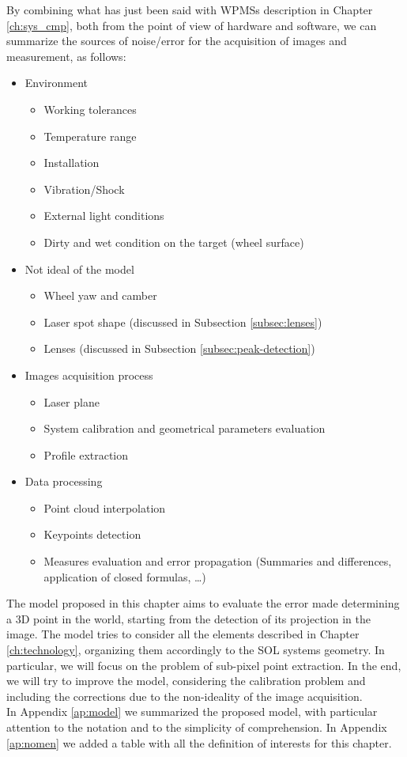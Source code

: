By combining what has just been said with \acs{WPMS}s description in Chapter \ref{ch:sys_cmp}, both from the point of view of hardware and software, we can summarize the sources of noise/error for the acquisition of images and measurement, as follows:
  \begin{itemize}
    \item Environment
      \begin{itemize}
        \item Working tolerances
        \item Temperature range
        \item Installation
        \item Vibration/Shock
        \item External light conditions
        \item Dirty and wet condition on the target (wheel surface)
      \end{itemize}
    \item Not ideal of the model
      \begin{itemize}
        \item Wheel yaw and camber
        \item Laser spot shape (discussed in Subsection \ref{subsec:lenses})
        \item Lenses (discussed in Subsection \ref{subsec:peak-detection})
      \end{itemize}
    \item Images acquisition process
      \begin{itemize}
        \item Laser plane
        \item System calibration and geometrical parameters evaluation
        \item Profile extraction
      \end{itemize}
    \item Data processing
      \begin{itemize}
        \item Point cloud interpolation
        \item Keypoints detection
        \item Measures evaluation and error propagation (Summaries and differences, application of closed formulas, \ldots)
      \end{itemize}
  \end{itemize}


The model proposed in this chapter aims to evaluate the error made determining a 3D point in the world, starting from the detection of its projection in the image. The model tries to consider all the elements described in Chapter \ref{ch:technology}, organizing them accordingly to the \acs{SOL} systems geometry. In particular, we will focus on the problem of sub-pixel point extraction. In the end, we will try to improve the model, considering the calibration problem and including the corrections due to the non-ideality of the image acquisition. \\

In Appendix \ref{ap:model} we summarized the proposed model, with particular attention to the notation and to the simplicity of comprehension. In Appendix \ref{ap:nomen} we added a table with all the definition of interests for this chapter.
